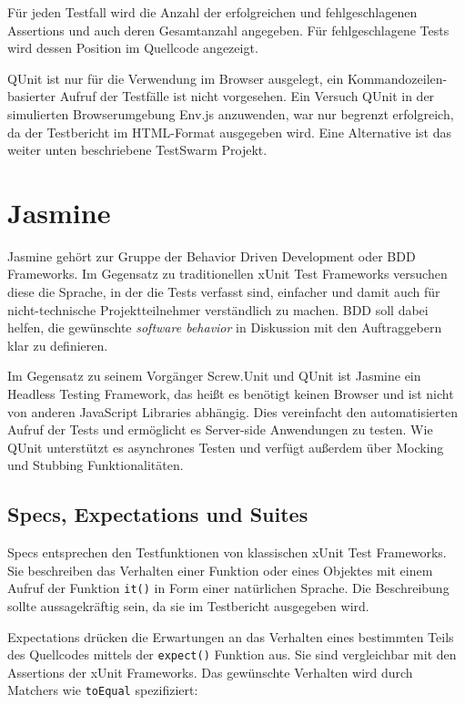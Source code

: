 \documentclass[11pt, a4paper]{article}
\begin{document}
Für jeden Testfall wird die Anzahl der erfolgreichen und fehlgeschlagenen
Assertions und auch deren Gesamtanzahl angegeben. Für fehlgeschlagene
Tests wird dessen Position im Quellcode angezeigt.

QUnit ist nur für die Verwendung im Browser ausgelegt, ein
Kommandozeilen-basierter Aufruf der Testfälle ist nicht vorgesehen. Ein
Versuch\cite{plee_qunit_2010} QUnit in der simulierten Browserumgebung
Env.js\cite{resig_envjs_2011} anzuwenden, war nur begrenzt erfolgreich, da der
Testbericht im HTML-Format ausgegeben wird. Eine Alternative ist das weiter
unten beschriebene TestSwarm Projekt.

\section{Jasmine}

Jasmine\cite{jasmine_jasmine_2011} gehört zur Gruppe der Behavior Driven
Development\cite{wikipedia_behavior_2011} oder BDD Frameworks. Im Gegensatz zu
traditionellen xUnit Test Frameworks versuchen diese die Sprache, in der die
Tests verfasst sind, einfacher und damit auch für nicht-technische
Projektteilnehmer verständlich zu machen. BDD soll dabei helfen, die gewünschte
\emph{software behavior} in Diskussion mit den Auftraggebern klar zu definieren.

Im Gegensatz zu seinem Vorgänger Screw.Unit\cite{sobo_screw.unit_2011} und QUnit
ist Jasmine ein Headless Testing Framework, das heißt es benötigt keinen
Browser und ist nicht von anderen JavaScript Libraries abhängig. Dies
vereinfacht den automatisierten Aufruf der Tests und ermöglicht es Server-side
Anwendungen zu testen. Wie QUnit unterstützt es asynchrones Testen und verfügt
außerdem über Mocking und Stubbing Funktionalitäten.

\subsection{Specs, Expectations und Suites}

Specs entsprechen den Testfunktionen von klassischen xUnit Test Frameworks. Sie
beschreiben das Verhalten einer Funktion oder eines Objektes mit einem Aufruf
der Funktion \texttt{it()} in Form einer natürlichen Sprache. Die Beschreibung
sollte aussagekräftig sein, da sie im Testbericht ausgegeben wird.

Expectations drücken die Erwartungen an das Verhalten eines bestimmten Teils des
Quellcodes mittels der \texttt{expect()} Funktion aus. Sie sind vergleichbar mit
den Assertions der xUnit Frameworks. Das gewünschte Verhalten wird durch
Matchers wie \texttt{toEqual} spezifiziert:
\end{document}
